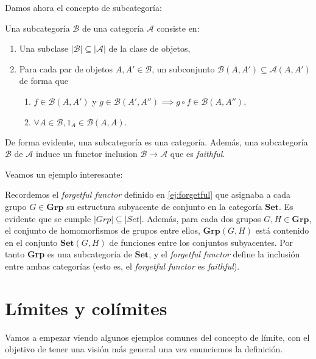 Damos ahora el concepto de subcategoría:

\begin{definicion}
    Una subcategoría $\mathscr{B}$ de una categoría $\mathscr{A}$ consiste en:
    \begin{enumerate}
        \item Una subclase $|\mathscr{B}| \subseteq |\mathscr{A}|$ de la clase de objetos,
        \item Para cada par de objetos $A,A' \in \mathscr{B}$, un subconjunto $\mathscr{B}(A,A') \subseteq \mathscr{A}(A,A')$ de forma que 
        \begin{enumerate}
            \item $f \in \mathscr{B}(A,A')$ y $g \in \mathscr{B}(A',A'') \implies g \circ f \in \mathscr{B}(A,A''),$ 
            \item $\forall A \in \mathscr{B}, 1_{A} \in \mathscr{B}(A,A).$
        \end{enumerate}

    \end{enumerate}
    De forma evidente, una subcategoría es una categoría. Además, una subcategoría $\mathscr{B}$ de $\mathscr{A}$ induce un functor inclusion $\mathscr{B} \longrightarrow \mathscr{A}$ que es \textit{faithful}.
\end{definicion}

Veamos un ejemplo interesante:
\begin{ejemplo}
    Recordemos el \textit{forgetful functor} definido en \ref{ej:forgetful} que asignaba a cada grupo $G \in \textbf{Grp}$ su estructura subyacente de conjunto en la categoría $\textbf{Set}$. Es evidente que se cumple $|Grp| \subseteq |Set|$. Además, para cada dos grupos $G, H \in \textbf{Grp}$, el conjunto de homomorfismos de grupos entre ellos, $\textbf{Grp}(G,H)$ está contenido en el conjunto $\textbf{Set}(G,H)$ de funciones entre los conjuntos subyacentes. Por tanto \textbf{Grp} es una subcategoría de $\textbf{Set}$, y el \textit{forgetful functor} define la inclusión entre ambas categorías (esto es, el \textit{forgetful functor} es \textit{faithful}).
\end{ejemplo}

\section{Límites y colímites}

Vamos a empezar viendo algunos ejemplos comunes del concepto de límite, con el objetivo de tener una visión más general una vez enunciemos la definición.

